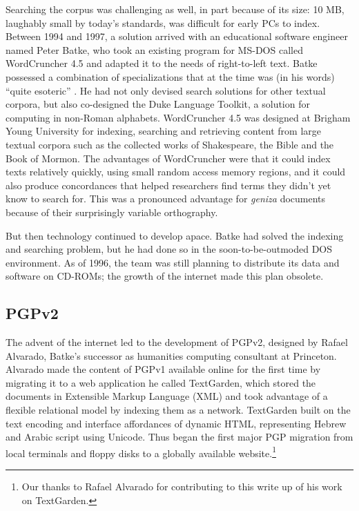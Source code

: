 \documentclass{article}
\begin{document}
Searching the corpus was challenging as well, in part because of its size: 10 MB, laughably small by today’s standards, was difficult for early PCs to index. Between 1994 and 1997, a solution arrived with an educational software engineer named Peter Batke, who took an existing program for MS-DOS called WordCruncher 4.5 and adapted it to the needs of right-to-left text. Batke possessed a combination of specializations that at the time was (in his words) “quite esoteric” \autocite{noauthor_background_nodate}. He had not only devised search solutions for other textual corpora, but also co-designed the Duke Language Toolkit, a solution for computing in non-Roman alphabets. WordCruncher 4.5 was designed at Brigham Young University for indexing, searching and retrieving content from large textual corpora such as the collected works of Shakespeare, the Bible and the Book of Mormon. The advantages of WordCruncher were that it could index texts relatively quickly, using small random access memory regions, and it could also produce concordances that helped researchers find terms they didn’t yet know to search for. This was a pronounced advantage for \textit{geniza} documents because of their surprisingly variable orthography. 

But then technology continued to develop apace. Batke had solved the indexing and searching problem, but he had done so in the soon-to-be-outmoded DOS environment. As of 1996, the team was still planning to distribute its data and software on CD-ROMs; the growth of the internet made this plan obsolete.

\subsection{PGPv2}

The advent of the internet led to the development of PGPv2, designed by Rafael Alvarado, Batke’s successor as humanities computing consultant at Princeton. Alvarado made the content of PGPv1 available online for the first time by migrating it to a web application he called TextGarden, which stored the documents in Extensible Markup Language (XML) and took advantage of a flexible relational model by indexing them as a network. TextGarden built on the text encoding and interface affordances of dynamic HTML, representing Hebrew and Arabic script using Unicode. Thus began the first major PGP migration from local terminals and floppy disks to a globally available website.\footnote{Our thanks to Rafael Alvarado for contributing to this write up of his work on TextGarden.} 
\end{document}
